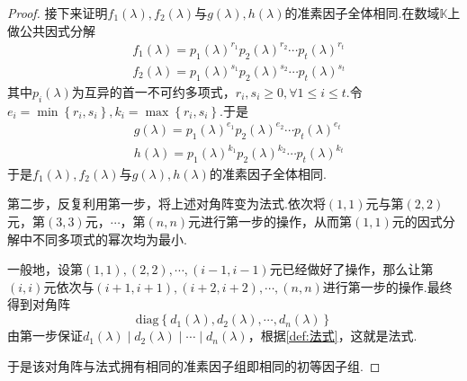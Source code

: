 {\begin{proof}
        接下来证明$f_1\left(\lambda\right),f_2\left(\lambda\right)$与$g\left(\lambda\right),h\left(\lambda\right)$的准素因子全体相同.在数域$\mathbb{K}$上做公共因式分解\begin{align*}
             & f_1\left(\lambda\right)=p_1\left(\lambda\right)^{r_1}p_2\left(\lambda\right)^{r_2}\cdots p_t\left(\lambda\right)^{r_t} \\
             & f_2\left(\lambda\right)=p_1\left(\lambda\right)^{s_1}p_2\left(\lambda\right)^{s_2}\cdots p_t\left(\lambda\right)^{s_t}
        \end{align*}其中$p_i\left(\lambda\right)$为互异的首一不可约多项式，$r_i,s_i\geqslant 0,\forall 1\leqslant i\leqslant t.$令$e_i=\min\left\{r_i,s_i\right\},k_i=\max\left\{r_i,s_i\right\}.$于是
        \begin{align*}
             & g\left(\lambda\right)=p_1\left(\lambda\right)^{e_1}p_2\left(\lambda\right)^{e_2}\cdots p_t\left(\lambda\right)^{e_t} \\
             & h\left(\lambda\right)=p_1\left(\lambda\right)^{k_1}p_2\left(\lambda\right)^{k_2}\cdots p_t\left(\lambda\right)^{k_t}
        \end{align*}于是$f_1\left(\lambda\right),f_2\left(\lambda\right)$与$g\left(\lambda\right),h\left(\lambda\right)$的准素因子全体相同.

        第二步，反复利用第一步，将上述对角阵变为法式.依次将$\left(1,1\right)$元与第$\left(2,2\right)$元，第$\left(3,3\right)$元，$\cdots$，第$\left(n,n\right)$元进行第一步的操作，从而第$\left(1,1\right)$元的因式分解中不同多项式的幂次均为最小.

        一般地，设第$\left(1,1\right),\left(2,2\right),\cdots,\left(i-1,i-1\right)$元已经做好了操作，那么让第$\left(i,i\right)$元依次与$\left(i+1,i+1\right),\left(i+2,i+2\right),\cdots,\left(n,n\right)$进行第一步的操作.最终得到对角阵\[
            \mathrm{diag}\left\{
            d_1\left(\lambda\right),d_2\left(\lambda\right),\cdots,d_n\left(\lambda\right)
            \right\}
        \]由第一步保证$d_1\left(\lambda\right)\mid d_2\left(\lambda\right)\mid \cdots\mid d_n\left(\lambda\right)$，根据\cref{def:法式}，这就是法式.

        于是该对角阵与法式拥有相同的准素因子组即相同的初等因子组.
    \end{proof}
}
